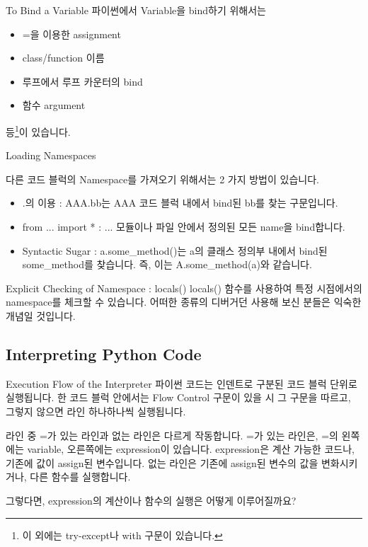 \documentclass{beamer}
\begin{document}
\begin{frame}[fragile]{To Bind a Variable}
파이썬에서 Variable을 bind하기 위해서는 

\begin{itemize} 
\item =을 이용한 assignment 
\item class/function 이름
\item 루프에서 루프 카운터의 bind
\item 함수 argument 
\end{itemize}

등\footnote{이 외에는 try-except나 with 구문이 있습니다.}이 있습니다. 

\end{frame}

\begin{frame}[fragile]{Loading Namespaces}

다른 코드 블럭의 Namespace를 가져오기 위해서는 2 가지 방법이 있습니다. 
\begin{itemize} 
\item .의 이용 : AAA.bb는 AAA 코드 블럭 내에서 bind된 bb를 찾는 구문입니다. 
\item from ... import * : ... 모듈이나 파일 안에서 정의된 모든 name을 bind합니다. 
\item Syntactic Sugar : a.some\_method()는 a의 클래스 정의부 내에서 bind된 some\_method를 찾습니다. 즉, 이는 A.some\_method(a)와 같습니다. 
\end{itemize}
\end{frame}

\begin{frame}[fragile]{Explicit Checking of Namespace : locals()}
locals() 함수를 사용하여 특정 시점에서의 namespace를 체크할 수 있습니다. 어떠한 종류의 디버거던 사용해 보신 분들은 익숙한 개념일 것입니다. 
\end{frame}

\subsection{Interpreting Python Code} 

\begin{frame}[fragile]{Execution Flow of the Interpreter}
파이썬 코드는 인덴트로 구분된 코드 블럭 단위로 실행됩니다. 한 코드 블럭 안에서는 Flow Control 구문이 있을 시 그 구문을 따르고, 그렇지 않으면 라인 하나하나씩 실행됩니다. 

라인 중 =가 있는 라인과 없는 라인은 다르게 작동합니다. =가 있는 라인은, =의 왼쪽에는 variable, 오른쪽에는 expression이 있습니다. expression은 계산 가능한 코드나, 기존에 값이 assign된 변수입니다. 없는 라인은 기존에 assign된 변수의 값을 변화시키거나, 다른 함수를 실행합니다. 

그렇다면, expression의 계산이나 함수의 실행은 어떻게 이루어질까요?
\end{frame}
\end{document}
